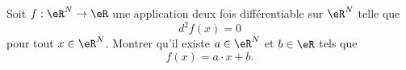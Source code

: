 \begin{exercice}[\coolexo!\coolexo]\label{exoCalculDifferentiel0017}

 Soit $f : \eR ^N \to \eR$ une application deux fois différentiable sur $\eR ^N$ telle que
 \begin{equation}
d^2 f (x) = 0
 \end{equation}
 pour tout $x\in\eR^N$. Montrer qu'il existe $a \in \eR^N$ et $b \in \eR$ tels que
 \begin{equation}
f(x) = a\cdot x + b.
 \end{equation}


\end{exercice}
